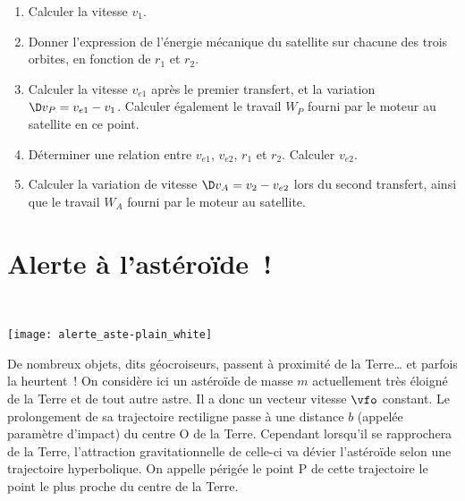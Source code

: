 \documentclass[a4paper, 10pt, final, garamond]{book}
\begin{document}
\begin{enumerate}
	\item Calculer la vitesse $v_1$.
	\item Donner l'expression de l'énergie mécanique du satellite sur chacune
	      des trois orbites, en fonction de $r_1$ et $r_2$.
	\item Calculer la vitesse $v_{e1}$ après le premier transfert, et la
	      variation $\D v_P = v_{e1}-v_1$. Calculer également le travail $W_P$
	      fourni par le moteur au satellite en ce point.
	\item Déterminer une relation entre $v_{e1}$, $v_{e2}$, $r_1$ et $r_2$.
	      Calculer $v_{e2}$.
	\item Calculer la variation de vitesse $\D v_A = v_2 - v_{e2}$ lors du
	      second transfert, ainsi que le travail $W_A$ fourni par le moteur au
	      satellite.
\end{enumerate}



\resetQ
\section{Alerte à l'astéroïde~!}
\noindent
\begin{minipage}[c]{.45\linewidth}
	~
	\begin{center}
		\texttt{[image: alerte\_aste-plain\_white]}
		\label{fig:aste}
	\end{center}
\end{minipage}
\hfill
\begin{minipage}[c]{.50\linewidth}
	De nombreux objets, dits géocroiseurs, passent à proximité de la Terre… et
	parfois la heurtent~!
	\smallbreak
	On considère ici un astéroïde de masse $m$ actuellement très éloigné de la
	Terre et de tout autre astre. Il a donc un vecteur vitesse $\vfo$ constant. Le
	prolongement de sa trajectoire rectiligne passe à une distance $b$ (appelée
	paramètre d'impact) du centre O de la Terre.
	\smallbreak
	Cependant lorsqu'il se rapprochera de la Terre, l'attraction gravitationnelle
	de celle-ci va dévier l'astéroïde selon une trajectoire hyperbolique. On
	appelle périgée le point P de cette trajectoire le point le plus proche du
	centre de la Terre.
\end{minipage}

\end{document}
